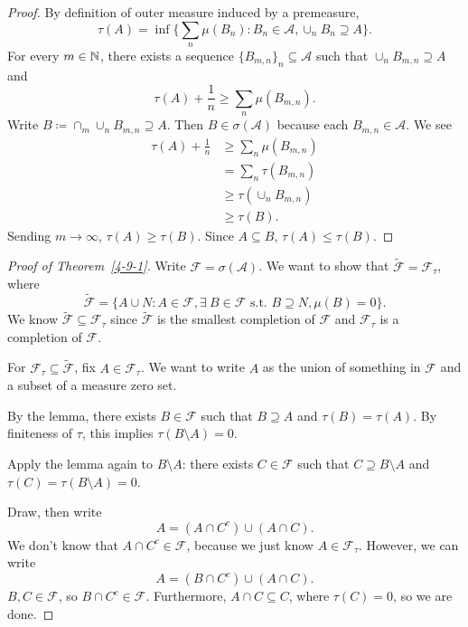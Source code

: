 \begin{proof}
	By definition of outer measure induced by a premeasure, \[
		\tau(A) = \inf \{\sum_n \mu(B_n) : B_n \in \mathscr{A}, \cup_n B_n \supseteq A\}
	.\] For every $m \in \mathbb{N}$, there exists a sequence $\{B_{m,n}\}_n \subseteq \mathscr{A}$ such that $\cup_n B_{m,n} \supseteq A$ and \[
		\tau(A) + \frac{1}{n} \ge \sum_n \mu(B_{m,n})
	.\] 
	Write $B \coloneqq \cap_m \cup_n B_{m,n} \supseteq A$. Then $B \in \sigma(\mathscr{A})$ because each $B_{m,n} \in \mathscr{A}$.
	We see
	\begin{align*}
		\tau(A) + \frac{1}{n} &\ge \sum_n \mu(B_{m,n}) \\
							  &= \sum_n \tau(B_{m,n}) \\
							  & \ge \tau \left( \cup_n B_{m,n} \right) \\
							  &\ge \tau(B)			
	.\end{align*}
	Sending $m \to \infty$, $\tau(A) \ge \tau(B)$. Since $A \subseteq B$, $\tau(A) \le \tau(B)$.
\end{proof}

\theoremproofstyle
\begin{proof}[Proof of Theorem~\ref{4-9-1}]
	Write $\mathscr{F} = \sigma(\mathscr{A})$. We want to show that $\tilde{\mathscr{F}} = \mathscr{F}_\tau$, where \[
		\tilde{\mathscr{F}} = \{A \cup N : A \in \mathscr{F}, \exists\  B \in \mathscr{F} \text{ s.t. } B \supseteq  N, \mu(B) = 0\}
	.\] We know $\tilde{\mathscr{F}} \subseteq \mathscr{F}_\tau$ since $\tilde{\mathscr{F}}$ is the smallest completion of $\mathscr{F}$ and $\mathscr{F}_\tau$ is a completion of $\mathscr{F}$.

	For $\mathscr{F}_\tau \subseteq \tilde{\mathscr{F}}$, fix $A \in \mathscr{F}_\tau$. We want to write $A$ as the union of something in $\mathscr{F}$ and a subset of a measure zero set.

	By the lemma, there exists $B \in \mathscr{F}$ such that $B \supseteq A$ and $\tau(B) = \tau(A)$. By finiteness of $\tau$, this implies $\tau(B \setminus A) = 0$.

	Apply the lemma again to $B \setminus A$: there exists $C \in \mathscr{F}$ such that $C \supseteq B \setminus A$ and $\tau(C) = \tau(B \setminus A) = 0$.

	Draw, then write \[
		A = \left( A \cap C^{c} \right) \cup \left( A\cap C \right)
	.\] We don't know that $A \cap C^{c} \in \mathscr{F}$, because we just know $A \in \mathscr{F}_\tau$. However, we can write \[
		A = (B \cap C^{c}) \cup (A \cap C)
	.\] $B, C \in \mathscr{F}$, so $B \cap C^{c} \in \mathscr{F}$. Furthermore, $A \cap C \subseteq C$, where $\tau(C) = 0$, so we are done.
\end{proof}
